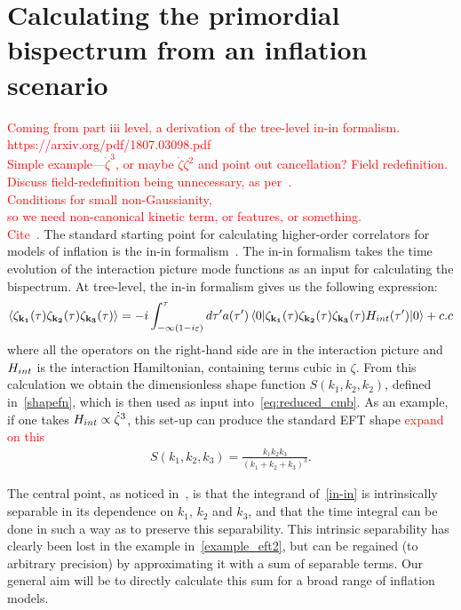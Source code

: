     \section{Calculating the primordial bispectrum from an inflation scenario}
    \textcolor{red}{Coming from part iii level, a derivation of the tree-level in-in formalism.\\
    https://arxiv.org/pdf/1807.03098.pdf\\
    Simple example---$\dot{\zeta}^3$, or maybe $\dot{\zeta}\zeta^2$ and point out cancellation?
    Field redefinition.\\
    Discuss field-redefinition being unnecessary, as per~\cite{px_burrage}.\\
    Conditions for small non-Gaussianity,\\
    so we need non-canonical kinetic term, or features, or something.\\
    Cite~\cite{Bartolo_review_2004, Chen_review_2010, Babich_2004, Baumann_horizon_2011}.}
    The standard starting point for calculating
higher-order correlators for models of inflation is the in-in formalism~\cite{Maldacena,weinberg_in_in}.
The in-in formalism takes the time evolution of the interaction picture mode
functions as an input for calculating the bispectrum.
At tree-level, the in-in formalism gives us the
following expression:
\begin{align}
{
    \left< \zeta_{\mathbf{k_1}}(\tau)\zeta_{\mathbf{k_2}}(\tau)\zeta_{\mathbf{k_3}}(\tau) \right>
=-i\int_{-\infty(1-i\varepsilon)}^{\tau}d\tau'a(\tau')
    \left<0\lvert \zeta_{\mathbf{k_1}}(\tau)\zeta_{\mathbf{k_2}}(\tau)\zeta_{\mathbf{k_3}}(\tau)H_{int}(\tau') \rvert0\right>+c.c\label{in-in}
}
\end{align}
where all the operators on the right-hand side are in the interaction picture
and $H_{int}$ is the interaction Hamiltonian, containing terms cubic in $\zeta$.
From this calculation we obtain the dimensionless shape function $S(k_1,k_2,k_2)$,
defined in~\eqref{shapefn},
which is then used as input into~\eqref{eq:reduced_cmb}.
As an example, if one takes $H_{int}\propto\dot{\zeta}^3$, this set-up can produce the standard EFT shape
\textcolor{red}{expand on this}
\begin{align}\label{example_eft2}
    S(k_1, k_2, k_3) = \frac{k_1k_2k_3}{(k_1+k_2+k_3)^3}.
\end{align}

The central point, as noticed in~\cite{Funakoshi}, is that the
integrand of~\eqref{in-in} is intrinsically separable
in its dependence on $k_1$, $k_2$ and $k_3$, and that the time integral
can be done in such a way as to preserve this separability.
This intrinsic separability has clearly been lost in
the example in~\eqref{example_eft2},
but can be regained (to arbitrary precision) by approximating it
with a sum of separable terms. Our general aim will be to directly calculate
this sum for a broad range of inflation models.


